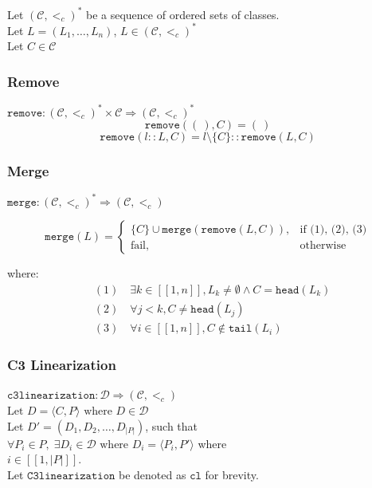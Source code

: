 \documentclass[runningheads]{llncs}
\newcommand*{\CC}{\ensuremath{\mathcal{C}}\xspace}
\newcommand*{\DD}{\ensuremath{\mathcal{D}}\xspace}
\newcommand*{\ordCC}{\ensuremath{(\mathcal{C}, <_c)}\xspace}
\newcommand*{\cl}{\texttt{c3linearization}}
\newcommand*{\rem}{\texttt{remove}}
\newcommand*{\h}{\texttt{head}}
\newcommand*{\mer}{\texttt{merge}}
\newcommand*{\oneToN}{\ensuremath{[\![1,n]\!]}\xspace}
\begin{document}
Let $\ordCC^*$ be a sequence of ordered sets of classes.\\
Let $L = (L_1, \ldots , L_n)$, $L \in \ordCC^*$\\
Let $C \in \mathcal{C}$\\

\subsubsection{Remove}

$\rem : \ordCC^* \times \CC \Rightarrow \ordCC^*$\\
\[
\rem(( \ ), C) = ( \ )
\]
\[
\rem(l::L, C) = l \setminus \{C\} :: \rem(L,C)
\]

\subsubsection{Merge}
\label{sec:mergeFunctionMath}
$\mer : \ordCC^* \Rightarrow \ordCC $

\begin{equation*}
\mer(L)=
\begin{cases} 
\{C\} \cup \mer(\rem(L, C)), & \text{if (1), (2), (3)} \\
\text{fail}, & \text{otherwise}
\end{cases}
\end{equation*}

where:
\begin{align*}
&(1) \quad \exists k \in \oneToN, L_k \neq \emptyset \land C = \h(L_k) \\
&(2) \quad \forall j < k, C \neq \h(L_j) \\
&(3) \quad \forall i \in \oneToN, C \notin \texttt{tail}(L_i)
\end{align*}

\subsubsection{C3 Linearization}
$\cl: \DD \Rightarrow \ordCC$\\
$\text{Let } D = \langle C, P \rangle \text{ where } D \in \DD$\\
Let $D' = (D_1,D_2, \dots ,D_{|P|})$, such that \\
$\forall P_i \in P, \; \exists D_i \in \DD \text{ where } D_i = \langle P_i, P' \rangle$ where\\ $i \in  [\![1, |P|]\!]$.\\
Let $\texttt{C3linearization}$ be denoted as $\texttt{cl}$ for brevity.
\end{document}
